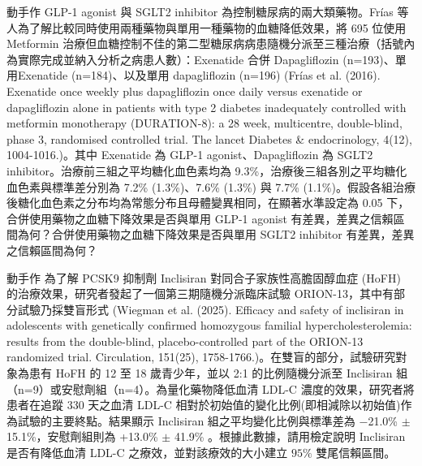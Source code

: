     \begin{custom}{動手作}
       GLP-1 agonist 與 SGLT2 inhibitor 為控制糖尿病的兩大類藥物。Frías 等人為了解比較同時使用兩種藥物與單用一種藥物的血糖降低效果，將 695 位使用 Metformin 治療但血糖控制不佳的第二型糖尿病病患隨機分派至三種治療（括號內為實際完成並納入分析之病患人數）：Exenatide 合併 Dapagliflozin (n=193)、單用Exenatide (n=184)、以及單用 dapagliflozin (n=196) (Frías et al. (2016). Exenatide once weekly plus dapagliflozin once daily versus exenatide or dapagliflozin alone in patients with type 2 diabetes inadequately controlled with metformin monotherapy (DURATION-8): a 28 week, multicentre, double-blind, phase 3, randomised controlled trial. The lancet Diabetes \& endocrinology, 4(12), 1004-1016.)。其中 Exenatide 為 GLP-1 agonist、Dapagliflozin 為 SGLT2 inhibitor。治療前三組之平均糖化血色素均為 9.3\%，治療後三組各別之平均糖化血色素與標準差分別為 7.2\% (1.3\%)、7.6\% (1.3\%) 與 7.7\% (1.1\%)。假設各組治療後糖化血色素之分布均為常態分布且母體變異相同，在顯著水準設定為 0.05 下，合併使用藥物之血糖下降效果是否與單用 GLP-1 agonist 有差異，差異之信賴區間為何？合併使用藥物之血糖下降效果是否與單用 SGLT2 inhibitor 有差異，差異之信賴區間為何？
    \end{custom}

    \answerbox{420pt}

    \bigskip

    \begin{custom}{動手作}
       為了解 PCSK9 抑制劑 Inclisiran 對同合子家族性高膽固醇血症 (HoFH) 的治療效果，研究者發起了一個第三期隨機分派臨床試驗 ORION-13，其中有部分試驗乃採雙盲形式 (Wiegman et al. (2025). Efficacy and safety of inclisiran in adolescents with genetically confirmed homozygous familial hypercholesterolemia: results from the double-blind, placebo-controlled part of the ORION-13 randomized trial. Circulation, 151(25), 1758-1766.)。在雙盲的部分，試驗研究對象為患有 HoFH 的 12 至 18 歲青少年，並以 2:1 的比例隨機分派至 Inclisiran 組（n=9）或安慰劑組（n=4）。為量化藥物降低血清 LDL-C 濃度的效果，研究者將患者在追蹤 330 天之血清 LDL-C 相對於初始值的變化比例(即相減除以初始值)作為試驗的主要終點。結果顯示 Inclisiran 組之平均變化比例與標準差為 −21.0\% $\pm$ 15.1\%，安慰劑組則為 +13.0\% $\pm$ 41.9\% 。根據此數據，請用檢定說明 Inclisiran 是否有降低血清 LDL-C 之療效，並對該療效的大小建立 $95\%$ 雙尾信賴區間。
    \end{custom}

    \answerbox{420pt}

    \pagebreak

